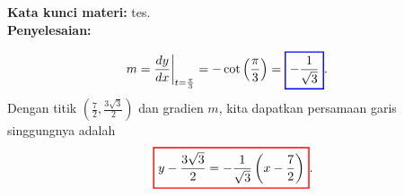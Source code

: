 \documentclass[10pt,openany,a4paper]{article}
\theoremstyle{definition}
\theoremstyle{definition}
\theoremstyle{plain}
\newenvironment{jawab}[2][tes]{
\textbf{Kata kunci materi:} #1.\\
\textbf{Penyelesaian:} #2
}{}
\newenvironment{jawaban}[2][tes]{
\colorlet{oldcolor}{.}
        \color{red}
        \setlength{\fboxrule}{1pt}\boxed{\color{oldcolor}#2}\color{oldcolor}.
}{}
\begin{document}
\begin{enumerate}
\begin{jawab}
{\begin{enumerate}
                    \begin{align*}
                        m &= \frac{dy}{dx}\bigg|_{t=\frac{\pi}{3}} = -\cot\left(\frac{\pi}{3}\right) = \colorlet{oldcolor}{.}
        \color{blue}        \setlength{\fboxrule}{1pt} \boxed{\color{oldcolor}-\frac{1}{\sqrt{3}}}\color{oldcolor}.
                    \end{align*}
                    Dengan titik $(\frac{7}{2}, \frac{3\sqrt{3}}{2})$ dan gradien $m$, kita dapatkan persamaan garis singgungnya adalah
                    \begin{align*}
                        \begin{jawaban}
                           {y - \frac{3\sqrt{3}}{2} = -\frac{1}{\sqrt{3}}\left(x - \frac{7}{2}\right)}
                        \end{jawaban}
                    \end{align*}
                \end{enumerate}
            }
        \end{jawab}
    


\end{enumerate}
\end{document}
